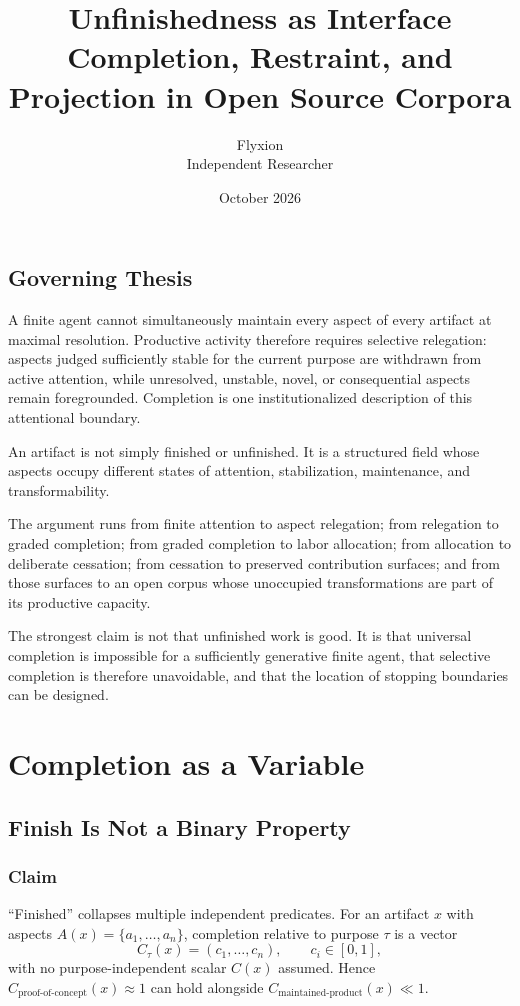 \documentclass[11pt,openany]{book}
\title{Unfinishedness as Interface\\[0.5em]
\large Completion, Restraint, and Projection in Open Source Corpora}
\author{Flyxion\\Independent Researcher}
\date{October 2026}
\begin{document}
\maketitle
\tableofcontents

\chapter*{Governing Thesis}

A finite agent cannot simultaneously maintain every aspect of every
artifact at maximal resolution. Productive activity therefore requires
selective relegation: aspects judged sufficiently stable for the current
purpose are withdrawn from active attention, while unresolved, unstable,
novel, or consequential aspects remain foregrounded. Completion is one
institutionalized description of this attentional boundary.

An artifact is not simply finished or unfinished. It is a structured field
whose aspects occupy different states of attention, stabilization,
maintenance, and transformability.

The argument runs from finite attention to aspect relegation; from
relegation to graded completion; from graded completion to labor
allocation; from allocation to deliberate cessation; from cessation to
preserved contribution surfaces; and from those surfaces to an open corpus
whose unoccupied transformations are part of its productive capacity.

The strongest claim is not that unfinished work is good. It is that
universal completion is impossible for a sufficiently generative finite
agent, that selective completion is therefore unavoidable, and that the
location of stopping boundaries can be designed.

\part{Completion as a Variable}

\chapter{Finish Is Not a Binary Property}
\section{Claim}
``Finished'' collapses multiple independent predicates. For an artifact $x$
with aspects $A(x)=\{a_1,\ldots,a_n\}$, completion relative to purpose
$\tau$ is a vector
\[
  C_\tau(x)=(c_1,\ldots,c_n),\qquad c_i\in[0,1],
\]
with no purpose-independent scalar $C(x)$ assumed. Hence
$C_{\text{proof-of-concept}}(x)\approx 1$ can hold alongside
$C_{\text{maintained-product}}(x)\ll 1$.
\end{document}
